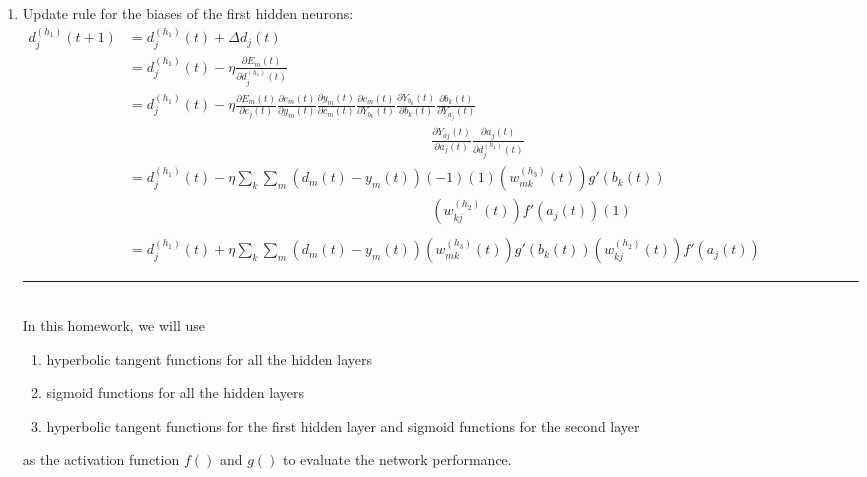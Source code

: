 \documentclass[12pt,a4paper]{article}
\begin{document}
\begin{CJK}{UTF8}{bsmi}
\begin{enumerate}
\begin{enumerate}
\newpage
\item Update rule for the biases of the first hidden neurons:
\vspace{0.5cm}
\\
$
\begin{aligned}
d_{j}^{(h_1)}(t+1) & =d_{j}^{(h_1)}(t)+\Delta d_{j}(t)
\\[0.5cm]
& =d_{j}^{(h_1)}(t)-\eta\frac{\partial E_m(t)}{\partial d_{j}^{(h_1)}(t)}
\\[0.5cm]
& =d_{j}^{(h_1)}(t)-\eta\frac{\partial E_m(t)}{\partial e_{j}(t)}
\frac{\partial e_{m}(t)}{\partial y_m(t)}
\frac{\partial y_m(t)}{\partial c_{m}(t)}
\frac{\partial c_m(t)}{\partial Y_{b_k}(t)}
\frac{\partial Y_{b_k}(t)}{\partial b_k(t)}
\frac{\partial b_k(t)}{\partial Y_{a_j}(t)}
\\[0.5cm]
&\ \hspace{9cm}
\frac{\partial Y_{aj}(t)}{\partial a_j(t)}
\frac{\partial a_{j}(t)}{\partial d_{j}^{(h_1)}(t)}
\\[0.5cm]
& =d_{j}^{(h_1)}(t)-\eta\sum_k\sum_m(d_m(t)-y_m(t))(-1)(1)(w_{mk}^{(h_3)}(t))
g'(b_k(t))
\\[0.5cm]
&\ \hspace{9cm}
(w_{kj}^{(h_2)}(t))f'(a_j(t))(1)
\\[0.5cm]
\\[0.5cm]
& =d_{j}^{(h_1)}(t)+\eta\sum_k\sum_m(d_m(t)-y_m(t))(w_{mk}^{(h_3)}(t))
g'(b_k(t))(w_{kj}^{(h_2)}(t))f'(a_j(t))
\end{aligned}
$
\\[0.5cm]
\noindent\rule{\textwidth}{1pt}
\\[0.5cm]
In this homework, we will use
\begin{enumerate}
\item hyperbolic tangent functions for all the hidden layers
\item sigmoid functions for all the hidden layers
\item hyperbolic tangent functions for the first hidden layer and sigmoid functions for the second layer
\end{enumerate}
as the activation function $f()$ and $g()$ to evaluate the network performance.

\end{enumerate}
\end{enumerate}
\newpage


\end{CJK}
\end{document}
